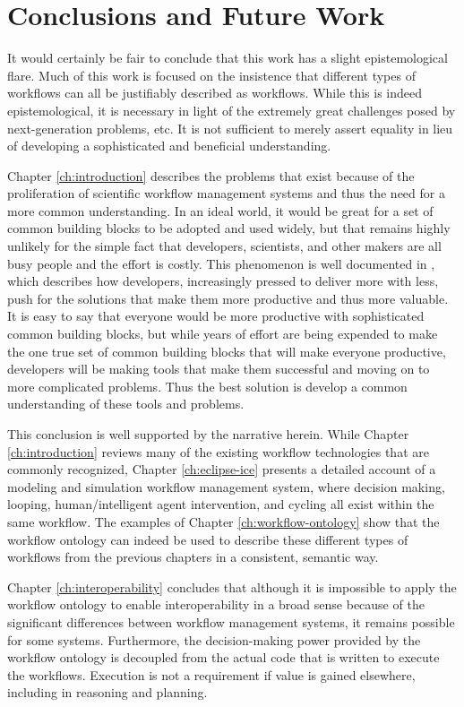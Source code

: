 \chapter{Conclusions and Future Work}\label{ch:conclusions}

It would certainly be fair to conclude that this work has a slight
epistemological flare. Much of this work is focused on the insistence that
different types of workflows can all be justifiably described as workflows.
While this is indeed epistemological, it is necessary in light of the extremely
great challenges posed by next-generation problems, etc. It is not sufficient to
merely assert equality in lieu of developing a sophisticated and beneficial
understanding.

Chapter \ref{ch:introduction} describes the problems that exist because of the
proliferation of scientific workflow management systems and thus the need for a
more common understanding. In an ideal world, it would be great for a set of
common building blocks to be adopted and used widely, but that remains highly
unlikely for the simple fact that developers, scientists, and other makers are
all busy people and the effort is costly. This phenomenon is well documented in
\cite{ogrady_new_2013}, which describes how developers, increasingly pressed to
deliver more with less, push for the solutions that make them more productive
and thus more valuable. It is easy to say that everyone would be more productive
with sophisticated common building blocks, but while years of effort are being
expended to make the one true set of common building blocks that will make
everyone productive, developers will be making tools that make them successful
and moving on to more complicated problems. Thus the best solution is develop a
common understanding of these tools and problems.

This conclusion is well supported by the narrative herein. While Chapter
\ref{ch:introduction} reviews many of the existing workflow technologies that
are commonly recognized, Chapter \ref{ch:eclipse-ice} presents a detailed
account of a modeling and simulation workflow management system, where decision
making, looping, human/intelligent agent intervention, and cycling all exist
within the same workflow. The examples of Chapter \ref{ch:workflow-ontology}
show that the workflow ontology can indeed be used to describe these different
types of workflows from the previous chapters in a consistent, semantic way.

Chapter \ref{ch:interoperability} concludes that although it is impossible to
apply the workflow ontology to enable interoperability in a broad sense because
of the significant differences between workflow management systems, it
remains possible for some systems. Furthermore, the decision-making power
provided by the workflow ontology is decoupled from the actual code that is
written to execute the workflows. Execution is not a requirement if value is
gained elsewhere, including in reasoning and planning.

